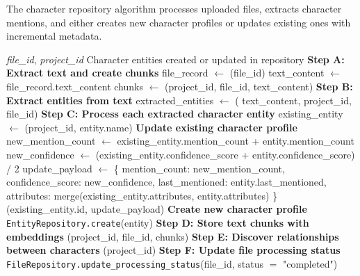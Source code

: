 The character repository algorithm processes uploaded files, extracts character mentions, and either creates new character profiles or updates existing ones with incremental metadata.

\begin{algorithm}[H]
\caption{ExtractAndPersistCharacterProfiles}
\small\begin{algorithmic}[1]
\Require \textit{file\_id}, \textit{project\_id}
\Ensure Character entities created or updated in repository
\State \textbf{Step A: Extract text and create chunks}
\State file\_record $\leftarrow$ \texttt{}(file\_id)
\State text\_content $\leftarrow$ file\_record.text\_content
\State chunks $\leftarrow$ \texttt{}(project\_id, file\_id, text\_content)
\State \textbf{Step B: Extract entities from text}
\State extracted\_entities $\leftarrow$ \texttt{}(
\Statex \hspace{2em} text\_content, project\_id, file\_id)
\State \textbf{Step C: Process each extracted character entity}
        \State existing\_entity $\leftarrow$ \texttt{}(project\_id, entity.name)
            \State \textbf{Update existing character profile}
            \State new\_mention\_count $\leftarrow$ existing\_entity.mention\_count + entity.mention\_count
            \State new\_confidence $\leftarrow$ (existing\_entity.confidence\_score + entity.confidence\_score) / 2
            \State update\_payload $\leftarrow$ \{
                \Statex \hspace{4em} mention\_count: new\_mention\_count,
                \Statex \hspace{4em} confidence\_score: new\_confidence,
                \Statex \hspace{4em} last\_mentioned: entity.last\_mentioned,
                \Statex \hspace{4em} attributes: merge(existing\_entity.attributes, entity.attributes)
            \}
            \State \texttt{}(existing\_entity.id, update\_payload)
        \Else
            \State \textbf{Create new character profile}
            \State \texttt{EntityRepository.create}(entity)
        \EndIf
    \EndIf
\EndFor
\State \textbf{Step D: Store text chunks with embeddings}
\State \texttt{}(project\_id, file\_id, chunks)
\State \textbf{Step E: Discover relationships between characters}
\State \texttt{}(project\_id)
\State \textbf{Step F: Update file processing status}
\State \texttt{FileRepository.update\_processing\_status}(file\_id, status $=$ "completed")
\end{algorithmic}\normalsize
\end{algorithm}
\FloatBarrier

